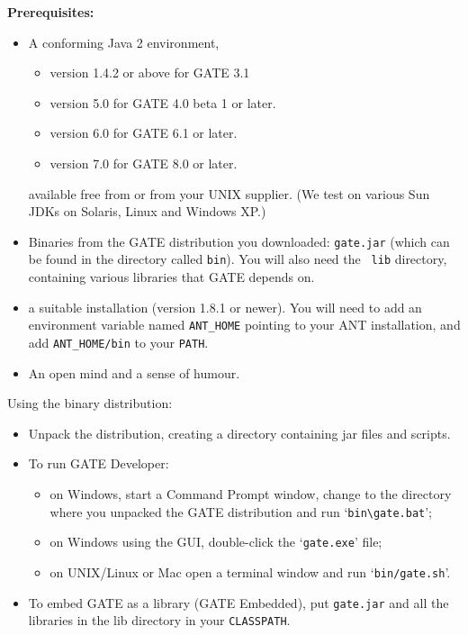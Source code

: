 {\bf Prerequisites:}
\begin{itemize}
\item
A conforming Java 2 environment,
  \begin{itemize}
  \item version 1.4.2 or above for GATE 3.1
  \item version 5.0 for GATE 4.0 beta 1 or later.
  \item version 6.0 for GATE 6.1 or later.
  \item version 7.0 for GATE 8.0 or later.
  \end{itemize}
available free from
or from your UNIX supplier. (We test on various Sun
JDKs on Solaris, Linux and Windows XP.)
\item Binaries from the GATE distribution you downloaded: {\tt gate.jar} (which
can be found in the directory called {\tt bin}). You will also need the {\tt
lib} directory, containing various libraries that GATE depends on.
\item a suitable  installation
(version 1.8.1 or newer). You will need to add an environment variable named
\verb!ANT_HOME! pointing to your ANT installation, and add \verb!ANT_HOME/bin!
to your {\tt PATH}.

\item An open mind and a sense of humour.
\end{itemize}

Using the binary distribution:
\begin{itemize}
\item
Unpack the distribution, creating a directory containing jar files and
scripts.
\item To run GATE Developer: 
  \begin{itemize}
  \item on Windows, start a Command Prompt window, change to the directory where
    you unpacked the GATE distribution and run `\verb!bin\gate.bat!';
  \item on Windows using the GUI, double-click the `\verb!gate.exe!' file;
  \item on UNIX/Linux or Mac open a terminal window and run
    `\verb!bin/gate.sh!'.
  \end{itemize}
\item
To embed GATE as a library (GATE Embedded), put {\tt gate.jar} and all
the libraries in the lib directory in your {\tt CLASSPATH}.
\end{itemize}

